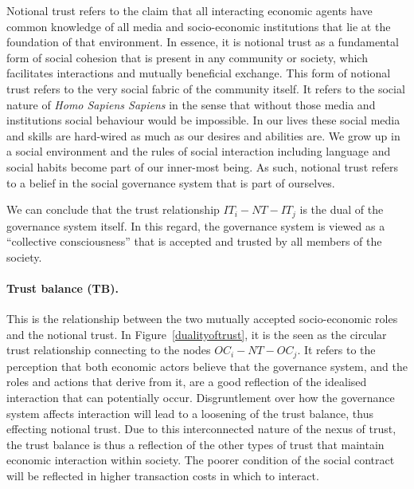 \begin{subappendices}
Notional trust refers to the claim that all interacting economic agents have common knowledge of all media and socio-economic institutions that lie at the foundation of that environment. In essence, it is notional trust as a fundamental form of social cohesion that is present in any community or society, which facilitates interactions and mutually beneficial exchange. This form of notional trust refers to the very social fabric of the community itself. It refers to the social nature of \textit{Homo Sapiens Sapiens} in the sense that without those media and institutions social behaviour would be impossible. In our lives these social media and skills are hard-wired as much as our desires and abilities are. We grow up in a social environment and the rules of social interaction including language and social habits become part of our inner-most being. As such, notional trust refers to a belief in the social governance system that is part of ourselves.

We can conclude that the trust relationship $IT_{i}-NT-IT_{j}$ is the dual of the governance system itself. In this regard, the governance system is viewed as a ``collective consciousness'' that is accepted and trusted by all members of the society.

\paragraph{Trust balance (TB).}

This is the relationship between the two mutually accepted socio-economic roles and the notional trust. In Figure~\ref{dualityoftrust}, it is the seen as the circular trust relationship connecting to the nodes $OC_{i}-NT-OC_{j}$. It refers to the perception that both economic actors believe that the governance system, and the roles and actions that derive from it, are a good reflection of the idealised interaction that can potentially occur. Disgruntlement over how the governance system affects interaction will lead to a loosening of the trust balance, thus effecting notional trust. Due to this interconnected nature of the nexus of trust, the trust balance is thus a reflection of the other types of trust that maintain economic interaction within society. The poorer condition of the social contract will be reflected in higher transaction costs in which to interact.


\end{subappendices}
